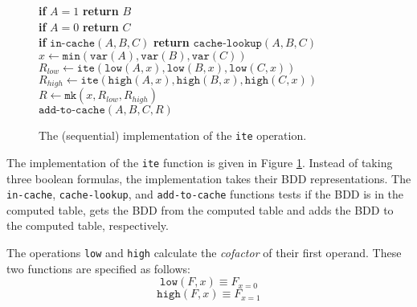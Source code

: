 \begin{figure}
	\centering
	\begin{algorithm}[H]
		\SetStartEndCondition{ }{}{}%
		\AlgoDontDisplayBlockMarkers\SetAlgoNoEnd\SetAlgoNoLine%

		 {
			\textbf{if} $A=1$ \textbf{return} $B$ \\
			\textbf{if} $A=0$ \textbf{return} $C$ \\
			\textbf{if} $\texttt{in-cache}(A, B, C)$ \textbf{return} $\texttt{cache-lookup}(A,B,C)$ \\
			$x \gets \texttt{min}(\texttt{var}(A), \texttt{var}(B), \texttt{var}(C))$ \\
			$R_{low} \gets \texttt{ite}(\texttt{low}(A, x), \texttt{low}(B, x), \texttt{low}(C, x))$ \\
			$R_{high} \gets \texttt{ite}(\texttt{high}(A, x), \texttt{high}(B, x), \texttt{high}(C, x))$ \\
			$R \gets \texttt{mk}(x, R_{low}, R_{high})$ \\
			$\texttt{add-to-cache}(A, B, C, R)$ \\
		}
	\end{algorithm}

	\caption{The (sequential) implementation of the \texttt{ite} operation.}
	\label{fig:ite_seq}
\end{figure}

The implementation of the \texttt{ite} function is given in Figure \ref{fig:ite_seq}. Instead of taking three boolean formulas, the implementation takes their BDD representations. The \texttt{in-cache}, \texttt{cache-lookup}, and \texttt{add-to-cache} functions tests if the BDD is in the computed table, gets the BDD from the computed table and adds the BDD to the computed table, respectively.

The operations \texttt{low} and \texttt{high} calculate the \emph{cofactor} of their first operand. These two functions are specified as follows:
\begin{equation}
	\texttt{low}(F, x) \equiv F_{x=0}
\end{equation}
\begin{equation}
	\texttt{high}(F, x) \equiv F_{x=1}
\end{equation}

